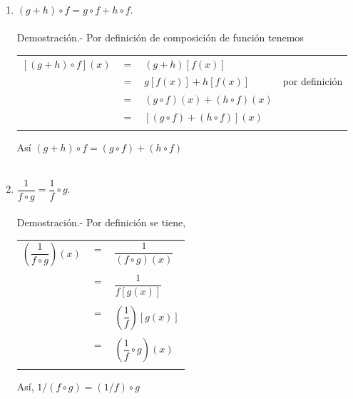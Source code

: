 \begin{enumerate}[\bfseries 1.]
\begin{enumerate}[\bfseries (a)]
		\item $(g+h) \circ f = g\circ f + h \circ f.$\\\\
		    Demostración.-\; Por definición de composición de función tenemos 
		    \begin{center}
			\begin{tabular}{rcll}
			    $\left[ \left( g+ h\right) \circ f \right] \left(x\right)$ & $=$ & $\left(g+h\right)\left[f(x)\right]$ & \\ 
			    & $=$ & $g\left[ f(x)\right] + h\left[f(x)\right]$ & por definición\\
			    & $=$ & $\left(g\circ f\right)(x) + \left(h \circ f\right)(x)$ & \\
			    & $=$ & $\left[ \left(g\circ f\right)  + \left(h \circ f\right)\right](x)$ &\\\\
			\end{tabular} 
		    \end{center}
		    Así  $(g+h)\circ f = (g\circ f)+(h \circ f)$\\\\

		\item $\dfrac{1}{f\circ g} = \dfrac{1}{f} \circ g.$\\\\
		    Demostración.-\; Por definición se tiene,
		    \begin{center}
			\begin{tabular}{rcl}
			    $\left( \dfrac{1}{f\circ g}\right)(x)$ & $=$ & $\dfrac{1}{(f\circ g)(x)}$\\\\
			    & $=$ & $\dfrac{1}{f\left[ g(x)\right] }$\\\\
			    & $=$ & $\left( \dfrac{1}{f}\right) \left[ g(x)\right]$\\\\
			    & $=$ & $\left( \dfrac{1}{f} \circ g\right)(x)$\\\\
			\end{tabular}
		    \end{center}
		    Así, $1/(f\circ g)=(1/f)\circ g$\\\\


\end{enumerate}
\end{enumerate}

